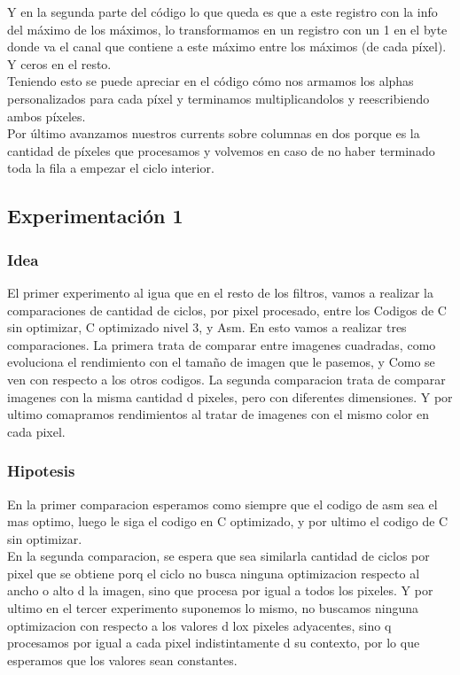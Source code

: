 	
	
   Y en la segunda parte del código lo que queda es que a este registro con la info del máximo de los máximos, lo transformamos en un registro con un 1 en el byte donde va el canal que contiene a este máximo entre los máximos (de cada píxel). Y ceros en el resto. \\ Teniendo esto se puede apreciar en el código cómo nos armamos los alphas personalizados para cada píxel y terminamos multiplicandolos y reescribiendo ambos píxeles. \\
   Por último avanzamos nuestros currents sobre columnas en dos porque es la cantidad de píxeles que procesamos y  volvemos en caso de no haber terminado toda la fila a empezar el ciclo interior.
	
	
\subsection{Experimentación 1}

\subsubsection{Idea}
	El primer experimento al igua que en el resto de los filtros, vamos a realizar la comparaciones 
	de cantidad de ciclos, por pixel procesado,  entre los Codigos de C sin optimizar, C optimizado nivel 3, y Asm. En esto vamos a realizar tres comparaciones. La primera trata de comparar entre imagenes cuadradas, como evoluciona el rendimiento con el tamaño de imagen que le pasemos, y Como se ven con respecto a los otros codigos. La segunda comparacion trata de comparar imagenes con la misma cantidad d pixeles, pero con diferentes dimensiones. Y por ultimo comapramos rendimientos al tratar de imagenes con el mismo color en cada pixel.
	
	
\subsubsection{Hipotesis}
	En la primer comparacion esperamos como siempre que el codigo de asm sea el mas optimo, luego le siga el codigo en C optimizado, y por ultimo el codigo de C sin optimizar. \\ 
	En la segunda comparacion, se espera que sea similarla cantidad de ciclos por pixel que se obtiene porq el ciclo no busca ninguna optimizacion respecto al ancho o alto d la imagen, sino que procesa por igual a todos los pixeles.
	Y por ultimo en el tercer experimento suponemos lo mismo, no buscamos ninguna optimizacion con respecto a los valores d lox pixeles adyacentes, sino q procesamos por igual a cada pixel indistintamente d su contexto, por lo que esperamos que los valores sean constantes.
	
